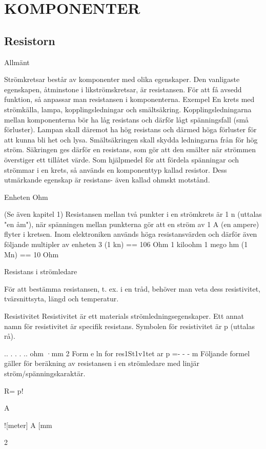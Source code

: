 \chapter{KOMPONENTER}

\section{Resistorn}

Allmänt

Strömkretsar består av komponenter med
olika egenskaper. Den vanligaste egenskapen, åtminstone i likströmskretsar, är resistansen. För att få avsedd funktion, så anpassar man resistansen i komponenterna.
Exempel
En krets med strömkälla, lampa, kopplingsledningar och smältsäkring. Kopplingsledningarna mellan komponenterna bör ha
låg resistans och därför lågt spänningsfall
(små förluster). Lampan skall däremot ha
hög resistans och därmed höga förluster för
att kunna bli het och lysa. Smältsäkringen
skall skydda ledningarna från för hög ström.
Säkringen ges därför en resistans, som gör
att den smälter när strömmen överstiger ett
tillåtet värde.
Som hjälpmedel för att fördela spänningar
och strömmar i en krets, så används en
komponenttyp kallad resistor. Dess utmärkande egenskap är resistans- även kallad
ohmskt motstånd.

Enheten Ohm

(Se även kapitel 1)
Resistansen mellan två punkter i en strömkrets är 1 n (uttalas "en åm"), när spänningen mellan punkterna gör att en ström av
1 A (en ampere) flyter i kretsen.
Inom elektroniken används höga resistansvärden och därför även följande multipler av enheten
3
(1 kn) == 106 Ohm
1 kiloohm
1 mego hm
(1 Mn) == 10 Ohm

Resistans i strömledare

För att bestämma resistansen, t. ex. i en tråd,
behöver man veta dess resistivitet, tvärsnittsyta, längd och temperatur.

Resistivitet
Resistivitet är ett materials strömledningsegenskaper. Ett annat namn för resistivitet
är specifik resistans. Symbolen för resistivitet
är p (uttalas rå).

..
. . . ..
ohm ·mm 2
Form e ln for res1St1v1tet ar p =- - - m
Följande formel gäller för beräkning av
resistansen i en strömledare med linjär ström/spänningskaraktär.

R= p!

A

![meter] A [mm

2

